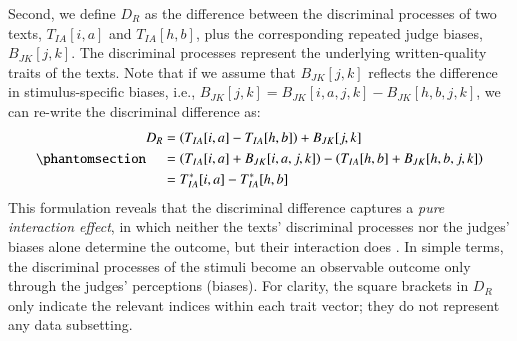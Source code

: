 \documentclass[
  authoryear,
  review,
  1p]{elsarticle}
\begin{document}
Second, we define \(D_{R}\) as the difference between the discriminal
processes of two texts, \(T_{IA}[i, a]\) and \(T_{IA}[h, b]\), plus the
corresponding repeated judge biases, \(B_{JK}[j, k]\). The discriminal
processes represent the underlying written-quality traits of the texts.
Note that if we assume that \(B_{JK}[j,k]\) reflects the difference in
stimulus-specific biases, i.e.,
\(B_{JK}[j,k] = B_{JK}[i,a,j,k] - B_{JK}[h,b,j,k]\), we can re-write the
discriminal difference as:
\begin{equation}\phantomsection\label{eq-mat52}{
\begin{aligned}
D_{R} &= \left( T_{IA}[i,a] - T_{IA}[h,b] \right) + B_{JK}[j,k] \\
&= \left( T_{IA}[i, a] + B_{JK}[i, a, j, k] \right) - \left( T_{IA}[h, b] + B_{JK}[h, b, j, k] \right) \\
& = T^{*}_{IA}[i,a] - T^{*}_{IA}[h,b]
\end{aligned}
}\end{equation} This formulation reveals that the discriminal difference
captures a \emph{pure interaction effect}, in which neither the texts'
discriminal processes nor the judges' biases alone determine the
outcome, but their interaction does \citep{Attia_et_al_2022}. In simple
terms, the discriminal processes of the stimuli become an observable
outcome only through the judges' perceptions (biases). For clarity, the
square brackets in \(D_{R}\) only indicate the relevant indices within
each trait vector; they do not represent any data subsetting.
\end{document}
